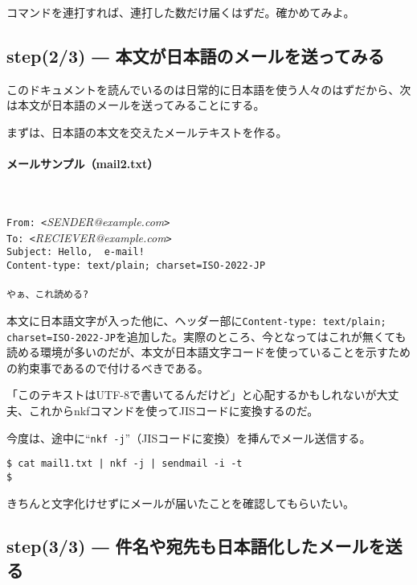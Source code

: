 コマンドを連打すれば、連打した数だけ届くはずだ。確かめてみよ。

\subsection*{step(2/3) ― 本文が日本語のメールを送ってみる}

このドキュメントを読んでいるのは日常的に日本語を使う人々のはずだから、次は本文が日本語のメールを送ってみることにする。

まずは、日本語の本文を交えたメールテキストを作る。
\paragraph{メールサンプル（mail2.txt）}　\\
\begin{frameboxit}{160.0mm}
	\verb|From: <|\textit{SENDER@example.com}\verb|>| \\
	\verb|To: <|\textit{RECIEVER@example.com}\verb|>| \\
	\verb|Subject: Hello,  e-mail!| \\
	\verb|Content-type: text/plain; charset=ISO-2022-JP| \\
	\verb|| \\
	\verb|やぁ、これ読める?|
\end{frameboxit}

本文に日本語文字が入った他に、ヘッダー部に\verb|Content-type: text/plain; charset=ISO-2022-JP|を追加した。実際のところ、今となってはこれが無くても読める環境が多いのだが、本文が日本語文字コードを使っていることを示すための約束事であるので付けるべきである。

「このテキストはUTF-8で書いてるんだけど」と心配するかもしれないが大丈夫、これからnkfコマンドを使ってJISコードに変換するのだ。

今度は、途中に``\verb|nkf -j|''（JISコードに変換）を挿んでメール送信する。

\begin{screen}
	\verb!$ cat mail1.txt | nkf -j | sendmail -i -t! \return \\
	\verb!$ !
\end{screen}

きちんと文字化けせずにメールが届いたことを確認してもらいたい。

\subsection*{step(3/3) ― 件名や宛先も日本語化したメールを送る}

